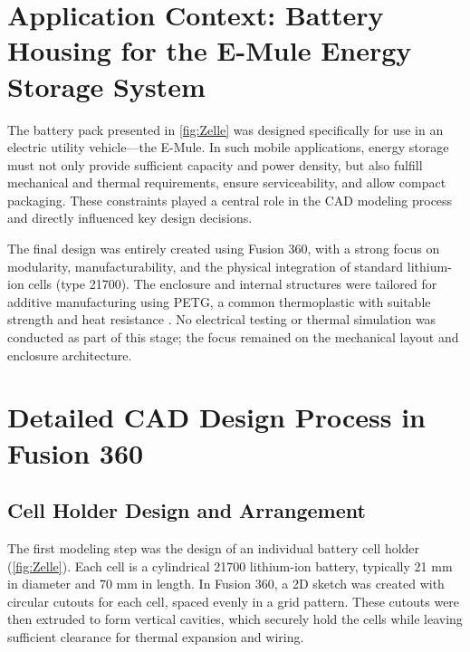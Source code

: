 \section{Application Context: Battery Housing for the E-Mule Energy Storage System}

\addtocounter{page}{1} %

The battery pack presented in \ref{fig:Zelle}  was designed specifically for use in an electric utility vehicle—the E-Mule. In such mobile applications, energy storage must not only provide sufficient capacity and power density, but also fulfill mechanical and thermal requirements, ensure serviceability, and allow compact packaging. These constraints played a central role in the CAD modeling process and directly influenced key design decisions.

The final design was entirely created using Fusion 360, with a strong focus on modularity, manufacturability, and the physical integration of standard lithium-ion cells (type 21700). The enclosure and internal structures were tailored for additive manufacturing using PETG, a common thermoplastic with suitable strength and heat resistance \cite{gebhardt2016}. No electrical testing or thermal simulation was conducted as part of this stage; the focus remained on the mechanical layout and enclosure architecture.

\section{Detailed CAD Design Process in Fusion 360}

\subsection{Cell Holder Design and Arrangement}

The first modeling step was the design of an individual battery cell holder (\ref{fig:Zelle}). Each cell is a cylindrical 21700 lithium-ion battery, typically 21 mm in diameter and 70 mm in length. In Fusion 360, a 2D sketch was created with circular cutouts for each cell, spaced evenly in a grid pattern. These cutouts were then extruded to form vertical cavities, which securely hold the cells while leaving sufficient clearance for thermal expansion and wiring.

